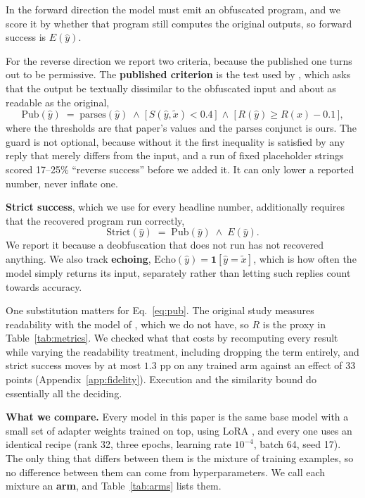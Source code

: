 \documentclass{article}
\begin{document}
In the forward direction the model must emit an obfuscated program, and we score it by
whether that program still computes the original outputs, so forward success is $E(\hat y)$.

For the reverse direction we report two criteria, because the published one turns out to be
permissive. The \textbf{published criterion} is the test used by
\citet{nikiema2025contrastive}, which asks that the output be textually dissimilar to the
obfuscated input and about as readable as the original,
\begin{equation}
\mathrm{Pub}(\hat y) \;=\; \mathrm{parses}(\hat y) \;\wedge\;
\big[\,S(\hat y,\tilde x) < 0.4\,\big] \;\wedge\;
\big[\,R(\hat y) \ge R(x) - 0.1\,\big],
\label{eq:pub}
\end{equation}
where the thresholds are that paper's values and the $\mathrm{parses}$ conjunct is ours. The
guard is not optional, because without it the first inequality is satisfied by any reply that
merely differs from the input, and a run of fixed placeholder strings scored 17--25\% ``reverse
success'' before we added it. It can only lower a reported number, never inflate one.

\textbf{Strict success}, which we use for every headline number, additionally requires that
the recovered program run correctly,
\begin{equation}
\mathrm{Strict}(\hat y) \;=\; \mathrm{Pub}(\hat y) \;\wedge\; E(\hat y).
\label{eq:strict}
\end{equation}
We report it because a deobfuscation that does not run has not recovered anything. We also
track \textbf{echoing}, $\mathrm{Echo}(\hat y)=\mathbf{1}[\hat y = \tilde x]$, which is how
often the model simply returns its input, separately rather than letting such replies count
towards accuracy.

One substitution matters for Eq.~\eqref{eq:pub}. The original study measures readability with
the model of \citet{scalabrino2018comprehension}, which we do not have, so $R$ is the proxy in
Table~\ref{tab:metrics}. We checked what that costs by recomputing every result while varying
the readability treatment, including dropping the term entirely, and strict success moves by
at most $1.3$ pp on any trained arm against an effect of 33 points
(Appendix~\ref{app:fidelity}). Execution and the similarity bound do essentially all the
deciding.

\textbf{What we compare.} Every model in this paper is the same base model with a small
set of adapter weights trained on top, using LoRA \citep{hu2022lora}, and every one uses an
identical recipe (rank 32, three epochs, learning rate $10^{-4}$, batch 64, seed 17). The
only thing that differs between them is the mixture of training examples, so no difference
between them can come from hyperparameters. We call each mixture an \textbf{arm}, and
Table~\ref{tab:arms} lists them.
\end{document}
